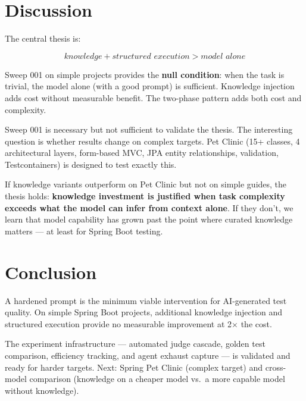 \documentclass[11pt,a4paper]{article}
\begin{document}
\section{Discussion}

The central thesis is:

\[
\textit{knowledge} + \textit{structured execution} > \textit{model alone}
\]

Sweep 001 on simple projects provides the \textbf{null condition}: when the task
is trivial, the model alone (with a good prompt) is sufficient. Knowledge injection
adds cost without measurable benefit. The two-phase pattern adds both cost and
complexity.

Sweep 001 is necessary but not sufficient to validate the thesis. The interesting
question is whether results change on complex targets. Pet Clinic (15+ classes,
4 architectural layers, form-based MVC, JPA entity relationships, validation,
Testcontainers) is designed to test exactly this.

If knowledge variants outperform on Pet Clinic but not on simple guides, the thesis
holds: \textbf{knowledge investment is justified when task complexity exceeds what
the model can infer from context alone}. If they don't, we learn that model
capability has grown past the point where curated knowledge matters --- at least
for Spring Boot testing.

\section{Conclusion}

A hardened prompt is the minimum viable intervention for AI-generated test quality.
On simple Spring Boot projects, additional knowledge injection and structured
execution provide no measurable improvement at 2$\times$ the cost.

The experiment infrastructure --- automated judge cascade, golden test comparison,
efficiency tracking, and agent exhaust capture --- is validated and ready for
harder targets. Next: Spring Pet Clinic (complex target) and cross-model comparison
(knowledge on a cheaper model vs.\ a more capable model without knowledge).
\end{document}
